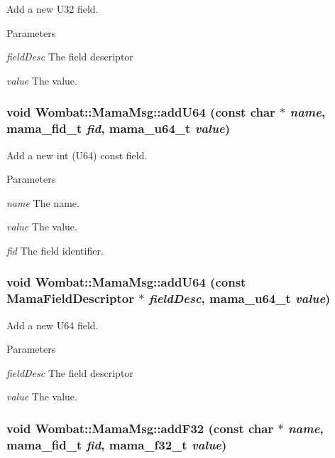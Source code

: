 Add a new U32 field. 
\begin{DoxyParams}{Parameters}
\item[{\em fieldDesc}]The field descriptor \item[{\em value}]The value. \end{DoxyParams}
\hypertarget{classWombat_1_1MamaMsg_a3fcd7c973c1771335faddf3302051b15}{
\subsubsection[{addU64}]{\setlength{\rightskip}{0pt plus 5cm}void Wombat::MamaMsg::addU64 (const char $\ast$ {\em name}, \/  mama\_\-fid\_\-t {\em fid}, \/  mama\_\-u64\_\-t {\em value})}}
\label{classWombat_1_1MamaMsg_a3fcd7c973c1771335faddf3302051b15}


Add a new int (U64) const field. 
\begin{DoxyParams}{Parameters}
\item[{\em name}]The name. \item[{\em value}]The value. \item[{\em fid}]The field identifier. \end{DoxyParams}
\hypertarget{classWombat_1_1MamaMsg_aaf9fe7b41797d219a9e0c0a1767c6dfc}{
\subsubsection[{addU64}]{\setlength{\rightskip}{0pt plus 5cm}void Wombat::MamaMsg::addU64 (const {\bf MamaFieldDescriptor} $\ast$ {\em fieldDesc}, \/  mama\_\-u64\_\-t {\em value})}}
\label{classWombat_1_1MamaMsg_aaf9fe7b41797d219a9e0c0a1767c6dfc}


Add a new U64 field. 
\begin{DoxyParams}{Parameters}
\item[{\em fieldDesc}]The field descriptor \item[{\em value}]The value. \end{DoxyParams}
\hypertarget{classWombat_1_1MamaMsg_a9975c49769bfa584edb7551fdcccd016}{
\subsubsection[{addF32}]{\setlength{\rightskip}{0pt plus 5cm}void Wombat::MamaMsg::addF32 (const char $\ast$ {\em name}, \/  mama\_\-fid\_\-t {\em fid}, \/  mama\_\-f32\_\-t {\em value})}}
\label{classWombat_1_1MamaMsg_a9975c49769bfa584edb7551fdcccd016}


